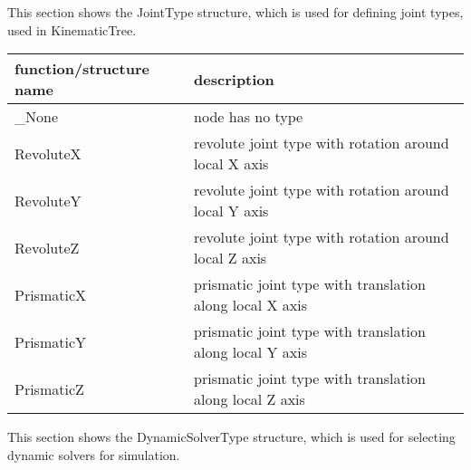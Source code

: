 \label{sec:JointType}
This section shows the JointType structure, which is used for defining joint types, used in KinematicTree.



\begin{center}
\footnotesize
\begin{longtable}{| p{8cm} | p{8cm} |} 
\hline
{\bf function/structure name} & {\bf description}\\ \hline
  \_None & node has no type\\ \hline 
  RevoluteX & revolute joint type with rotation around local X axis\\ \hline 
  RevoluteY & revolute joint type with rotation around local Y axis\\ \hline 
  RevoluteZ & revolute joint type with rotation around local Z axis\\ \hline 
  PrismaticX & prismatic joint type with translation along local X axis\\ \hline 
  PrismaticY & prismatic joint type with translation along local Y axis\\ \hline 
  PrismaticZ & prismatic joint type with translation along local Z axis\\ \hline 
\end{longtable}
\end{center}

\label{sec:DynamicSolverType}
This section shows the DynamicSolverType structure, which is used for selecting dynamic solvers for simulation.



